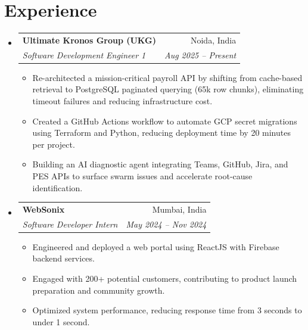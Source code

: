 \documentclass[a4paper,11pt]{article}
\makeatletter
\newcommand{\resumeSubheading}[4]{
  \item
  \begin{tabular*}{\textwidth}{l@{\extracolsep{\fill}}r}
    \textbf{#1} & #2 \\
    \textit{#3} & \textit{#4} \\
  \end{tabular*}\vspace{-6pt}
}
\newcommand{\resumeItem}[1]{
  \item \small{#1 \vspace{-2pt}}
}
\makeatother
\begin{document}
\section{Experience}
\begin{itemize}

  \resumeSubheading
    {Ultimate Kronos Group (UKG)}{Noida, India}
    {Software Development Engineer 1}{Aug 2025 -- Present}

  \begin{itemize}
    \resumeItem{Re-architected a mission-critical payroll API by shifting from cache-based retrieval to PostgreSQL paginated querying (65k row chunks), eliminating timeout failures and reducing infrastructure cost.}
    \resumeItem{Created a GitHub Actions workflow to automate GCP secret migrations using Terraform and Python, reducing deployment time by 20 minutes per project.}
    \resumeItem{Building an AI diagnostic agent integrating Teams, GitHub, Jira, and PES APIs to surface swarm issues and accelerate root-cause identification.}
  \end{itemize}

  \resumeSubheading
    {WebSonix}{Mumbai, India}
    {Software Developer Intern}{May 2024 -- Nov 2024}

  \begin{itemize}
    \resumeItem{Engineered and deployed a web portal using ReactJS with Firebase backend services.}
    \resumeItem{Engaged with 200+ potential customers, contributing to product launch preparation and community growth.}
    \resumeItem{Optimized system performance, reducing response time from 3 seconds to under 1 second.}
  \end{itemize}

\end{itemize}

\end{document}
